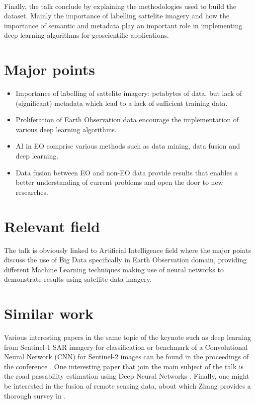\documentclass[11pt,a4paper]{article}
\begin{document}
\paragraph{}

Finally, the talk conclude by explaining the methodologies used to build the dataset. Mainly the importance of labelling sattelite imagery and how the importance of semantic and metadata play an important role in implementing deep learning algorithms for geoscientific applications.

\section{Major points}

\begin{itemize}
  \item Importance of labelling of sattelite imagery: petabytes of data, but lack of (significant) metadata which lead to a lack of sufficient training data.
  \item Proliferation of Earth Observation data encourage the implementation of various deep learning algorithms.
  \item AI in EO comprise various methods such as data mining, data fusion and deep learning.
  \item Data fusion between EO and non-EO data provide results that enables a better understanding of current problems and open the door to new researches.
\end{itemize}



\section{Relevant field}

The talk is obviously linked to Artificial Intelligence field where the major points discuss the use of Big Data specifically in Earth Observation domain, providing different Machine Learning techniques making use of neural networks to demonstrate results using satellite data imagery.

\section{Similar work}

Various interesting papers in the same topic of the keynote such as deep learning from Sentinel-1 SAR imagery for classification or benchmark of a Convolutional Neural Network (CNN) for Sentinel-2 images can be found in the proceedings of the conference . One interesting paper that join the main subject of the talk is the road passability estimation using Deep Neural Networks . Finally, one might be interested in the fusion of remote sensing data, about which Zhang provides a thorough survey in .
\end{document}
